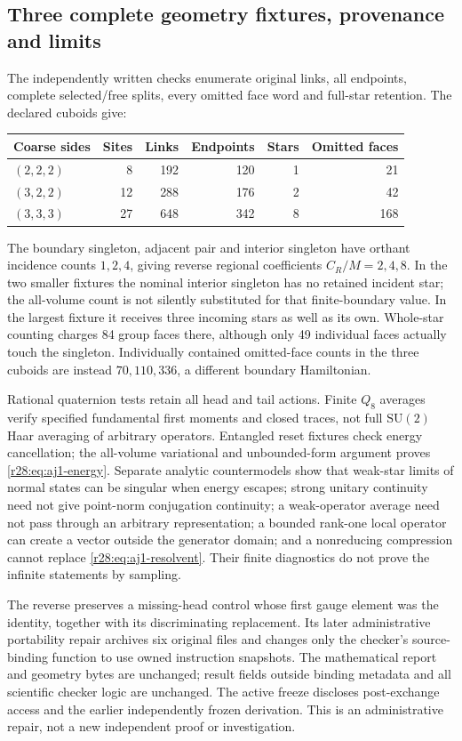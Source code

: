 \subsection{Three complete geometry fixtures, provenance and limits}
The independently written checks enumerate original links, all endpoints, complete selected/free splits, every omitted face word and full-star retention. The declared cuboids give:
\begin{center}\small
\begin{tabular}{@{}lrrrrr@{}}\toprule
Coarse sides & Sites & Links & Endpoints & Stars & Omitted faces\\\midrule
$(2,2,2)$&8&192&120&1&21\\
$(3,2,2)$&12&288&176&2&42\\
$(3,3,3)$&27&648&342&8&168\\\bottomrule
\end{tabular}
\end{center}
The boundary singleton, adjacent pair and interior singleton have orthant incidence counts $1,2,4$, giving reverse regional coefficients $C_R/M=2,4,8$. In the two smaller fixtures the nominal interior singleton has no retained incident star; the all-volume count is not silently substituted for that finite-boundary value. In the largest fixture it receives three incoming stars as well as its own. Whole-star counting charges 84 group faces there, although only 49 individual faces actually touch the singleton. Individually contained omitted-face counts in the three cuboids are instead $70,110,336$, a different boundary Hamiltonian.

Rational quaternion tests retain all head and tail actions. Finite $Q_8$ averages verify specified fundamental first moments and closed traces, not full $\mathrm{SU}(2)$ Haar averaging of arbitrary operators. Entangled reset fixtures check energy cancellation; the all-volume variational and unbounded-form argument proves \eqref{r28:eq:aj1-energy}. Separate analytic countermodels show that weak-star limits of normal states can be singular when energy escapes; strong unitary continuity need not give point-norm conjugation continuity; a weak-operator average need not pass through an arbitrary representation; a bounded rank-one local operator can create a vector outside the generator domain; and a nonreducing compression cannot replace \eqref{r28:eq:aj1-resolvent}. Their finite diagnostics do not prove the infinite statements by sampling.

The reverse preserves a missing-head control whose first gauge element was the identity, together with its discriminating replacement. Its later administrative portability repair archives six original files and changes only the checker's source-binding function to use owned instruction snapshots. The mathematical report and geometry bytes are unchanged; result fields outside binding metadata and all scientific checker logic are unchanged. The active freeze discloses post-exchange access and the earlier independently frozen derivation. This is an administrative repair, not a new independent proof or investigation.

